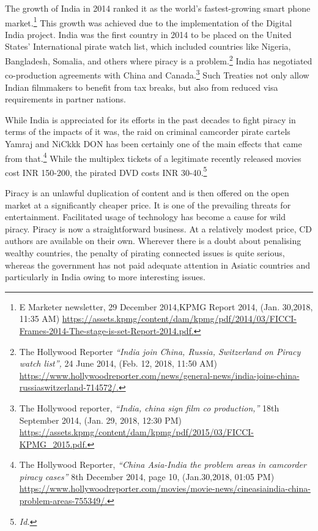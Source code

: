 \begin{multicols}{2}
\noi
The growth of India in 2014 ranked it as the world's fastest-growing smart phone market.\footnote{E Marketer newsletter, 29 December 2014,KPMG Report 2014, (Jan. 30,2018, 11:35 AM)   \url{https://assets.kpmg/content/dam/kpmg/pdf/2014/03/FICCI-Frames-2014-The-stage-is-set-Report-2014.pdf.}}
This growth was achieved due to the implementation of the Digital India project. India was
the first country in 2014 to be placed on the United States' International pirate watch list,
which included countries like Nigeria, Bangladesh, Somalia, and others where piracy is a
problem.\footnote{The Hollywood Reporter \textit{“India join China, Russia, Switzerland on Piracy watch list”,} 24 June 2014, (Feb.
12, 2018, 11:50 AM) \url{https://www.hollywoodreporter.com/news/general-news/india-joins-china-russiaswitzerland-714572/.}} India has negotiated co-production agreements with China and Canada.\footnote{The Hollywood reporter, \textit{“India, china sign film co production,”} 18th September 2014, (Jan. 29, 2018, 12:30 PM)  \url{https://assets.kpmg/content/dam/kpmg/pdf/2015/03/FICCI-KPMG_2015.pdf.}} Such
Treaties not only allow Indian filmmakers to benefit from tax breaks, but also from reduced
visa requirements in partner nations.

\vspace{-.1cm}

\noi
While India is appreciated for its efforts in the past decades to fight piracy in terms of the
impacts of it was, the raid on criminal camcorder pirate cartels Yamraj and NiCkkk DON has
been certainly one of the main effects that came from that.\footnote{The Hollywood Reporter, \textit{“China Asia-India the problem areas in camcorder piracy cases”} 8th December 2014, page 10, (Jan.30,2018, 01:05 PM)  \url{https://www.hollywoodreporter.com/movies/movie-news/cineasiaindia-china-problem-areas-755349/.}} While the multiplex tickets of a legitimate recently released movies cost INR 150-200, the pirated DVD costs INR 30-40.\footnote{\textit{Id.}}

\vspace{-.1cm}


\vspace{-.1cm}

\noi
Piracy is an unlawful duplication of content and is then offered on the open market at a
significantly cheaper price. It is one of the prevailing threats for entertainment. Facilitated
usage of technology has become a cause for wild piracy. Piracy is now a straightforward
business. At a relatively modest price, CD authors are available on their own. Wherever there
is a doubt about penalising wealthy countries, the penalty of pirating connected issues is quite
serious, whereas the government has not paid adequate attention in Asiatic countries and
particularly in India owing to more interesting issues.


\end{multicols}
